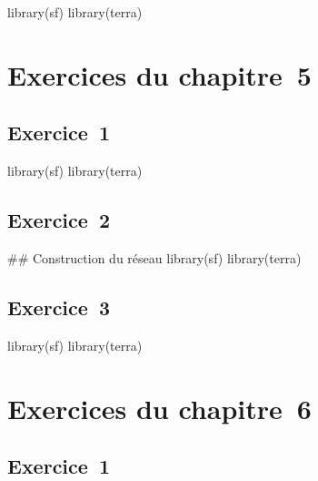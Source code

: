 \documentclass[
  letterpaper,
  DIV=11,
  numbers=noendperiod]{scrreprt}
\newenvironment{Shaded}{\begin{snugshade}}{\end{snugshade}}
\newcommand{\CommentTok}[1]{\textcolor[rgb]{0.37,0.37,0.37}{#1}}
\newcommand{\NormalTok}[1]{\textcolor[rgb]{0.00,0.23,0.31}{#1}}
\begin{document}
\begin{Shaded}
\begin{Highlighting}[]
\NormalTok{library(sf)}
\NormalTok{library(terra)}
\end{Highlighting}
\end{Shaded}

\section{Exercices du chapitre~5}\label{sec-0805}

\subsection{Exercice~1}\label{sec-08051}

\begin{Shaded}
\begin{Highlighting}[]
\NormalTok{library(sf)}
\NormalTok{library(terra)}
\end{Highlighting}
\end{Shaded}

\subsection{Exercice~2}\label{sec-08052}

\begin{Shaded}
\begin{Highlighting}[]
\CommentTok{\#\# Construction du réseau}
\NormalTok{library(sf)}
\NormalTok{library(terra)}
\end{Highlighting}
\end{Shaded}

\subsection{Exercice~3}\label{sec-08053}

\begin{Shaded}
\begin{Highlighting}[]
\NormalTok{library(sf)}
\NormalTok{library(terra)}
\end{Highlighting}
\end{Shaded}

\section{Exercices du chapitre~6}\label{sec-0806}

\subsection{Exercice~1}\label{sec-08061}
\end{document}
